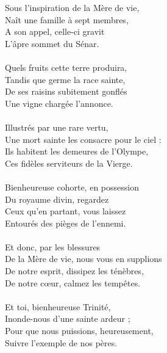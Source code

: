 Sous l’inspiration de la Mère de vie,\\
Naît une famille à sept membres,\\
A son appel, celle-ci gravit\\
L’âpre sommet du Sénar.\\
\\
Quels fruits cette terre produira,\\
Tandis que germe la race sainte,\\
De ses raisins subitement gonflés\\
Une vigne chargée l’annonce.\\
\\
Illustrés par une rare vertu,\\
Une mort sainte les consacre pour le ciel :\\
Ils habitent les demeures de l’Olympe,\\
Ces fidèles serviteurs de la Vierge.\\
\\
Bienheureuse cohorte, en possession\\
Du royaume divin, regardez\\
Ceux qu’en partant, vous laissez\\
Entourés des pièges de l’ennemi.\\
\\
Et donc, par les blessures\\
De la Mère de vie, nous vous en supplions\\
De notre esprit, dissipez les ténèbres,\\
De notre cœur, calmez les tempêtes.\\
\\
Et toi, bienheureuse Trinité,\\
Inonde-nous d’une sainte ardeur ;\\
Pour que nous puissions, heureusement,\\
Suivre l’exemple de nos pères.
